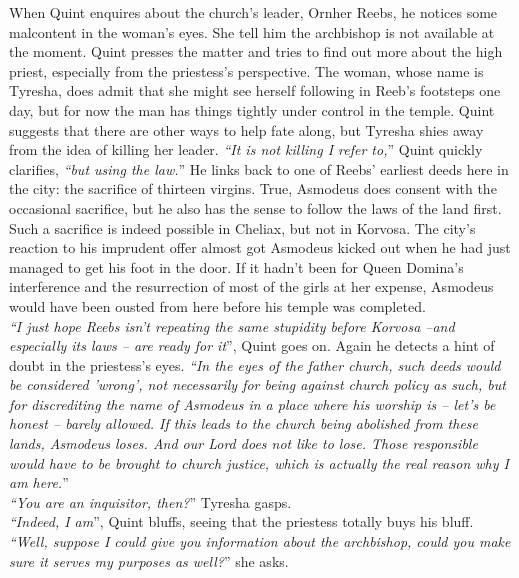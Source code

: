 When Quint enquires about the church's leader, Ornher Reebs, he notices some malcontent in the woman's eyes. She tell him the archbishop is not available at the moment. Quint presses the matter and tries to find out more about the high priest, especially from the priestess's perspective. The woman, whose name is Tyresha, does admit that she might see herself following in Reeb's footsteps one day, but for now the man has things tightly under control in the temple. Quint suggests that there are other ways to help fate along, but Tyresha shies away from the idea of killing her leader. {\itshape``It is not killing I refer to,}'' Quint quickly clarifies, {\itshape``but using the law.}'' He links back to one of Reebs' earliest deeds here in the city: the sacrifice of thirteen virgins. True, Asmodeus does consent with the occasional sacrifice, but he also has the sense to follow the laws of the land first. Such a sacrifice is indeed possible in Cheliax, but not in Korvosa. The city's reaction to his imprudent offer almost got Asmodeus kicked out when he had just managed to get his foot in the door. If it hadn't been for Queen Domina's interference and the resurrection of most of the girls at her expense, Asmodeus would have been ousted from here before his temple was completed.\\

{\itshape``I just hope Reebs isn't repeating the same stupidity before Korvosa --and especially its laws -- are ready for it}'', Quint goes on. Again he detects a hint of doubt in the priestess's eyes. {\itshape``In the eyes of the father church, such deeds would be considered 'wrong', not necessarily for being against church policy as such, but for discrediting the name of Asmodeus in a place where his worship is -- let's be honest -- barely allowed. If this leads to the church being abolished from these lands, Asmodeus loses. And our Lord does not like to lose. Those responsible would have to be brought to church justice, which is actually the real reason why I am here.}''\\

{\itshape``You are an inquisitor, then?}'' Tyresha gasps.\\

{\itshape``Indeed, I am}'', Quint bluffs, seeing that the priestess totally buys his bluff.\\

{\itshape``Well, suppose I could give you information about the archbishop, could you make sure it serves my purposes as well?}'' she asks.\\

